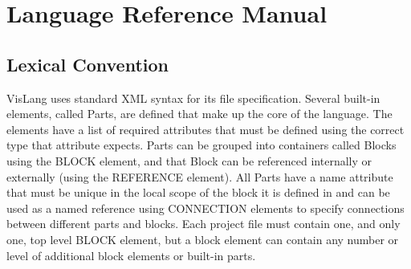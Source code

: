 \section{Language Reference Manual}

\subsection{Lexical Convention}
VisLang uses standard XML syntax for its file specification.
Several built-in elements, called Parts, are defined that make up the core of the language.
The elements have a list of required attributes that must be defined using the correct type that attribute expects.
Parts can be grouped into containers called Blocks using the BLOCK element, and that Block can be referenced internally or externally (using the REFERENCE element).
 All Parts have a name attribute that must be unique in the local scope of the block it is defined in and can be used as a named reference using CONNECTION elements to specify connections between different parts and blocks.
Each project file must contain one, and only one, top level BLOCK element, but a block element can contain any number or level of additional block elements or built-in parts.


